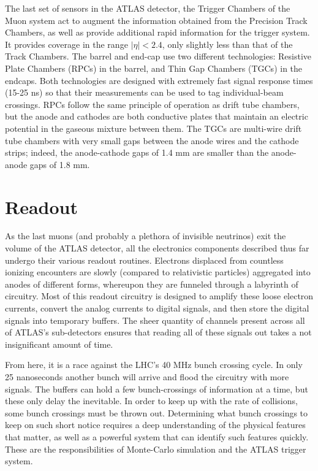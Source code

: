         The last set of sensors in the ATLAS detector, the Trigger Chambers of the Muon system act to augment the information obtained from the Precision Track Chambers, as well as provide additional rapid information for the trigger system.
        It provides coverage in the range $|\eta| < 2.4$, only slightly less than that of the Track Chambers.
        The barrel and end-cap use two different technologies:
            Resistive Plate Chambers (RPCs) in the barrel, and Thin Gap Chambers (TGCs) in the endcaps.
        Both technologies are designed with extremely fast signal response times (15-25 ns) so that their measurements can be used to tag individual-beam crossings.
        RPCs follow the same principle of operation as drift tube chambers, but the anode and cathodes are both conductive plates that maintain an electric potential in the gaseous mixture between them.
        The TGCs are multi-wire drift tube chambers with very small gaps between the anode wires and the cathode strips;
            indeed, the anode-cathode gaps of 1.4 mm are smaller than the anode-anode gaps of 1.8 mm.

    

\section{Readout}

    As the last muons (and probably a plethora of invisible neutrinos) exit the volume of the ATLAS detector,
        all the electronics components described thus far undergo their various readout routines.
    Electrons displaced from countless ionizing encounters are slowly (compared to relativistic particles)
        aggregated into anodes of different forms,
        whereupon they are funneled through a labyrinth of circuitry.
    Most of this readout circuitry is designed to amplify these loose electron currents,
        convert the analog currents to digital signals,
        and then store the digital signals into temporary buffers.
    The sheer quantity of channels present across all of ATLAS's sub-detectors ensures that
        reading all of these signals out takes a not insignificant amount of time.

    From here, it is a race against the LHC's 40 MHz bunch crossing cycle.
    In only 25 nanoseconds another bunch will arrive and flood the circuitry with more signals.
    The buffers can hold a few bunch-crossings of information at a time, but these only delay the inevitable.
    In order to keep up with the rate of collisions, some bunch crossings must be thrown out.
    Determining what bunch crossings to keep on such short notice
        requires a deep understanding of the physical features that matter,
        as well as a powerful system that can identify such features quickly.
    These are the responsibilities of Monte-Carlo simulation and the ATLAS trigger system. 


